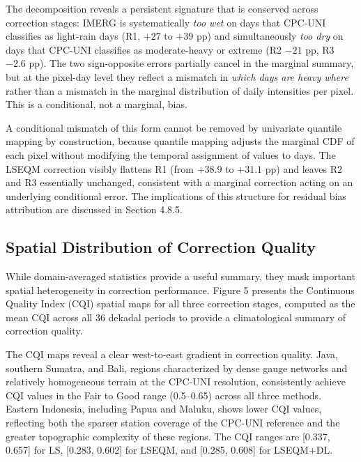 \documentclass[11pt,a4paper]{article}
\begin{document}
The decomposition reveals a persistent signature that is conserved
across correction stages: IMERG is systematically \emph{too wet} on days
that CPC-UNI classifies as light-rain days (R1, \(+27\) to \(+39\) pp)
and simultaneously \emph{too dry} on days that CPC-UNI classifies as
moderate-heavy or extreme (R2 \(-21\) pp, R3 \(-2.6\) pp). The two
sign-opposite errors partially cancel in the marginal summary, but at
the pixel-day level they reflect a mismatch in \emph{which days are
heavy where} rather than a mismatch in the marginal distribution of
daily intensities per pixel. This is a conditional, not a marginal,
bias.

A conditional mismatch of this form cannot be removed by univariate
quantile mapping by construction, because quantile mapping adjusts the
marginal CDF of each pixel without modifying the temporal assignment of
values to days. The LSEQM correction visibly flattens R1 (from \(+38.9\)
to \(+31.1\) pp) and leaves R2 and R3 essentially unchanged, consistent
with a marginal correction acting on an underlying conditional error.
The implications of this structure for residual bias attribution are
discussed in Section 4.8.5.

\subsection{Spatial Distribution of Correction
Quality}

While domain-averaged statistics provide a useful summary, they mask
important spatial heterogeneity in correction performance. Figure 5
presents the Continuous Quality Index (CQI) spatial maps for all three
correction stages, computed as the mean CQI across all 36 dekadal
periods to provide a climatological summary of correction quality.

The CQI maps reveal a clear west-to-east gradient in correction quality.
Java, southern Sumatra, and Bali, regions characterized by dense gauge
networks and relatively homogeneous terrain at the CPC-UNI resolution,
consistently achieve CQI values in the Fair to Good range (0.5--0.65)
across all three methods. Eastern Indonesia, including Papua and Maluku,
shows lower CQI values, reflecting both the sparser station coverage of
the CPC-UNI reference and the greater topographic complexity of these
regions. The CQI ranges are {[}0.337, 0.657{]} for LS, {[}0.283,
0.602{]} for LSEQM, and {[}0.285, 0.608{]} for LSEQM+DL.
\end{document}
